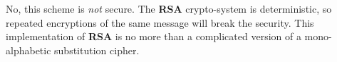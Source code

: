 \documentclass[../CryptoHW3.tex]{subfiles}
\begin{document}
\begin{flushleft}



  No, this scheme is \emph{not} secure.  The \textbf{RSA} crypto-system is deterministic, so repeated encryptions of the same message will break the security.  This implementation of \textbf{RSA} is no more than a complicated version of a mono-alphabetic substitution cipher.


























\end{flushleft}
\end{document}
